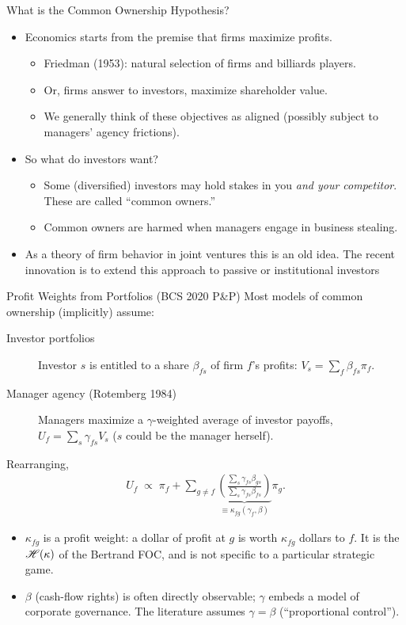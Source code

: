 \documentclass[aspectratio=169,10pt]{beamer}
\begin{document}
\begin{frame}[plain]{What is the Common Ownership Hypothesis?}
\begin{itemize}
\item Economics starts from the premise that firms maximize profits.
\begin{itemize}
\item Friedman (1953): natural selection of firms and billiards players.
\item Or, firms answer to investors, \alert{maximize shareholder value}.
\item We generally think of these objectives as aligned (possibly subject to managers' agency frictions).
\end{itemize}
\item So what do investors want?
\begin{itemize}
\item Some (diversified) investors may hold stakes in you \textit{and your competitor}. These are called ``common owners.''
\item Common owners are harmed when managers engage in \alert{business stealing}.
\end{itemize}
\item As a theory of firm behavior in \alert{joint ventures} this is an old idea. The recent innovation is to extend this approach to \alert{passive or institutional investors}
\end{itemize}
\end{frame}


\begin{frame}{Profit Weights from Portfolios (BCS 2020 P\&P)}
\small
Most models of common ownership (implicitly) assume:
\begin{description}
\item[Investor portfolios] Investor $s$ is entitled to a share $\beta_{fs}$ of firm $f$'s profits: $V_s = \sum_{f} \beta_{fs} \pi_f$.
\item[Manager agency (Rotemberg 1984)] Managers maximize a $\gamma$-weighted average of investor payoffs, $U_f = \sum_{s} \gamma_{fs} V_s$ ($s$ could be the manager herself).
\end{description}
Rearranging,
\begin{align*}
U_f \;\propto\; \pi_{f}+\sum_{g \neq f} \underbrace{\left(\frac{\sum_{s} \gamma_{f s} \beta_{g s}}{\sum_{s} \gamma_{f s} \beta_{f s}}\right)}_{\equiv \kappa_{f g}(\gamma_{f}, \beta)} \pi_{g} .
\end{align*}
\begin{itemize}
\item $\kappa_{fg}$ is a \alert{profit weight}: a dollar of profit at $g$ is worth $\kappa_{fg}$ dollars to $f$. It is the $\mathscr{H}(\kappa)$ of the Bertrand FOC, and is not specific to a particular strategic game.
\item $\beta$ (cash-flow rights) is often directly observable; $\gamma$ embeds a model of corporate governance. The literature assumes $\gamma = \beta$ (``proportional control'').
\end{itemize}
\end{frame}
\end{document}
